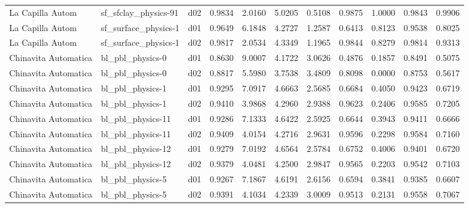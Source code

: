 \begin{longtable}{lllrrrrrrrr}
     La Capilla Autom  &  sf\_sfclay\_physics-91 &     d02 &   0.9834 &   2.0160 &   5.0205 &       0.5108 &        0.9875 &       1.0000 &           0.9843 &  0.9906 \\
     La Capilla Autom  &  sf\_surface\_physics-1 &     d01 &   0.9649 &   6.1848 &   4.2727 &       1.2587 &        0.6413 &       0.8123 &           0.9538 &  0.8025 \\
     La Capilla Autom  &  sf\_surface\_physics-1 &     d02 &   0.9817 &   2.0534 &   4.3349 &       1.1965 &        0.9844 &       0.8279 &           0.9814 &  0.9313 \\
 Chinavita Automatica  &      bl\_pbl\_physics-0 &     d01 &   0.8630 &   9.0007 &   4.1722 &       3.0626 &        0.4876 &       0.1857 &           0.8491 &  0.5075 \\
 Chinavita Automatica  &      bl\_pbl\_physics-0 &     d02 &   0.8817 &   5.5980 &   3.7538 &       3.4809 &        0.8098 &       0.0000 &           0.8753 &  0.5617 \\
 Chinavita Automatica  &      bl\_pbl\_physics-1 &     d01 &   0.9295 &   7.0917 &   4.6663 &       2.5685 &        0.6684 &       0.4050 &           0.9423 &  0.6719 \\
 Chinavita Automatica  &      bl\_pbl\_physics-1 &     d02 &   0.9410 &   3.9868 &   4.2960 &       2.9388 &        0.9623 &       0.2406 &           0.9585 &  0.7205 \\
 Chinavita Automatica  &     bl\_pbl\_physics-11 &     d01 &   0.9286 &   7.1333 &   4.6422 &       2.5925 &        0.6644 &       0.3943 &           0.9411 &  0.6666 \\
 Chinavita Automatica  &     bl\_pbl\_physics-11 &     d02 &   0.9409 &   4.0154 &   4.2716 &       2.9631 &        0.9596 &       0.2298 &           0.9584 &  0.7160 \\
 Chinavita Automatica  &     bl\_pbl\_physics-12 &     d01 &   0.9279 &   7.0192 &   4.6564 &       2.5784 &        0.6752 &       0.4006 &           0.9401 &  0.6720 \\
 Chinavita Automatica  &     bl\_pbl\_physics-12 &     d02 &   0.9379 &   4.0481 &   4.2500 &       2.9847 &        0.9565 &       0.2203 &           0.9542 &  0.7103 \\
 Chinavita Automatica  &      bl\_pbl\_physics-5 &     d01 &   0.9267 &   7.1867 &   4.6191 &       2.6156 &        0.6594 &       0.3841 &           0.9385 &  0.6607 \\
 Chinavita Automatica  &      bl\_pbl\_physics-5 &     d02 &   0.9391 &   4.1034 &   4.2339 &       3.0009 &        0.9513 &       0.2131 &           0.9558 &  0.7067 \\

\end{longtable}
